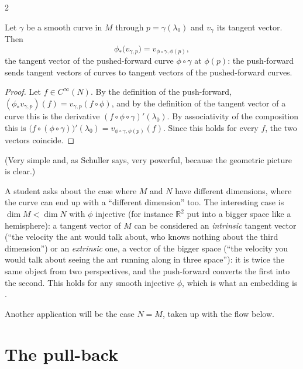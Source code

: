 \begin{paracol}{2}
\begin{theorem}\label{thm:c11-curve}
Let $\gamma$ be a smooth curve in $M$ through $p=\gamma(\lambda_0)$ and $v_\gamma$ its tangent vector. Then
\[
  \phi_*\bigl(v_{\gamma,p}\bigr)=v_{\phi\circ\gamma,\phi(p)},
\]
the tangent vector of the pushed-forward curve $\phi\circ\gamma$ at $\phi(p)$: the push-forward sends tangent vectors of curves to tangent vectors of the pushed-forward curves.
\end{theorem}
\begin{proof}
Let $f\in C^\infty(N)$. By the definition of the push-forward, $(\phi_*v_{\gamma,p})(f)=v_{\gamma,p}(f\circ\phi)$, and by the definition of the tangent vector of a curve this is the derivative $(f\circ\phi\circ\gamma)'(\lambda_0)$. By associativity of the composition this is $\bigl(f\circ(\phi\circ\gamma)\bigr)'(\lambda_0)=v_{\phi\circ\gamma,\phi(p)}(f)$. Since this holds for every $f$, the two vectors coincide.
\end{proof}
(Very simple and, as Schuller says, very powerful, because the geometric picture is clear.)

\begin{coursenote}
A student asks about the case where $M$ and $N$ have different dimensions, where the curve can end up with a ``different dimension'' too. The interesting case is $\dim M<\dim N$ with $\phi$ injective (for instance $\mathbb R^2$ put into a bigger space like a hemisphere): a tangent vector of $M$ can be considered an \emph{intrinsic} tangent vector (``the velocity the ant would talk about, who knows nothing about the third dimension'') or an \emph{extrinsic} one, a vector of the bigger space (``the velocity you would talk about seeing the ant running along in three space''): it is twice the same object from two perspectives, and the push-forward converts the first into the second. This holds for any smooth injective $\phi$, which is what an embedding is .
\end{coursenote}
Another application will be the case $N=M$, taken up with the flow below.

\section{The pull-back}\label{sec:c11-pull}


\end{paracol}
